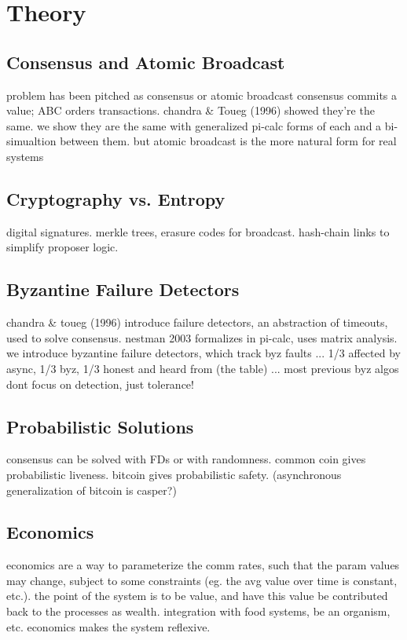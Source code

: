 \chapter{Theory}

\section{Consensus and Atomic Broadcast}
problem has been pitched as consensus or atomic broadcast
consensus commits a value; ABC orders transactions.
chandra & Toueg (1996) showed they're the same.
we show they are the same with generalized pi-calc forms of each and a bi-simualtion between them.
but atomic broadcast is the more natural form for real systems

\section{Cryptography vs. Entropy}
digital signatures.
merkle trees, erasure codes for broadcast.
hash-chain links to simplify proposer logic.

\section{Byzantine Failure Detectors}
chandra & toueg (1996) introduce failure detectors, an abstraction of timeouts,
used to solve consensus.
nestman 2003 formalizes in pi-calc, uses matrix analysis.
we introduce byzantine failure detectors, which track byz faults ...
1/3 affected by async, 1/3 byz, 1/3 honest and heard from (the table) ...
most previous byz algos dont focus on detection, just tolerance!

\section{Probabilistic Solutions}
consensus can be solved with FDs or with randomness.
common coin gives probabilistic liveness.
bitcoin gives probabilistic safety.
(asynchronous generalization of bitcoin is casper?)

\section{Economics}
economics are a way to parameterize the comm rates,
such that the param values may change, subject to some constraints 
(eg. the avg value over time is constant, etc.).
the point of the system is to be value, 
and have this value be contributed back to the processes as wealth.
integration with food systems, be an organism, etc.
economics makes the system reflexive.

